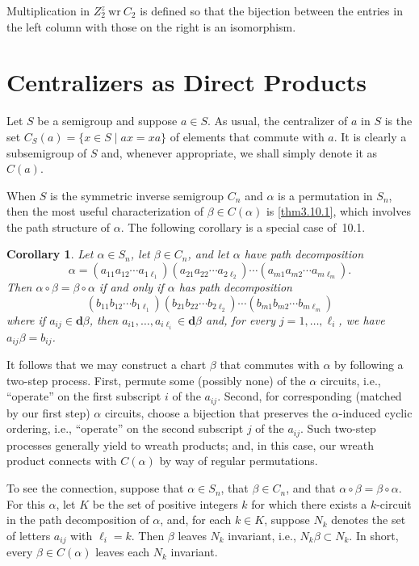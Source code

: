 \documentclass{surv-l}
\numberwithin{equation}{section}
\numberwithin{table}{section}
\numberwithin{figure}{section}
\theoremstyle{plain}
\newtheorem{corollary}[equation]{Corollary}
\theoremstyle{definition}
\begin{document}
Multiplication in $Z_{2}^{z}\  \mathrm{wr} \ C_{2}$ is defined so
that the bijection between the entries in the left column with
those on the right is an isomorphism.

\section[Centralizers as Directs Products]{Centralizers as Direct Products}\label{sec4.13}

Let $S$ be a semigroup and suppose $a\in S$. As usual, the
centralizer of $a$ in $S$ is the set $C_{S}(a)=\{x\in S \mid
ax =xa\}$ of elements that commute with $a$. It is clearly a
subsemigroup of $S$ and, whenever appropriate, we shall simply
denote it as~$C(a)$.

When $S$ is the symmetric inverse semigroup $C_{n}$ and $\alpha$
is a permutation in $S_{n}$, then the most useful characterization
of $\beta\in C(\alpha)$ is \ref{thm3.10.1}, which involves the
path structure of $\alpha$. The following corollary is a special
case of~10.1.

\begin{corollary}\label{cor3.13.1}
Let $\alpha\in S_{n}$, let $\beta\in C_{n}$, and let $\alpha$ have
path decomposition
\[
\alpha=(a_{11}a_{12}\cdots a_{1\ell_{1}})(a_{21}a_{22}\cdots a_{2\ell_{2}})\cdots(a_{m1}a_{m2}\cdots a_{m\ell_{m}}).
\]
Then $\alpha \circ\beta=\beta \circ\alpha$ if and only if $\alpha$
has path decomposition
\[
(b_{11}b_{12}\cdots b_{1\ell_{1}})(b_{21}b_{22}\cdots b_{2\ell_{2}})\cdots(b_{m1}b_{m2}\cdots b_{m\ell_{m}})
\]
where if $a_{ij}\in \mathbf{d}\beta$, then $a_{i1},\ldots,
a_{i\ell_{i}}\in \mathbf{d}\beta$ and, for every $j=1,\ldots,
\ell_{i}$, we have $a_{ij}\beta=b_{ij}$.
\end{corollary}

It follows that we may construct a chart $\beta$ that commutes
with $\alpha$ by following a two-step process. First, permute some
(possibly none) of the $\alpha$ circuits, i.e., ``operate'' on the
first subscript $i$ of the $a_{ij}$. Second, for corresponding
(matched by our first step) $\alpha$ circuits, choose a bijection
that preserves the $\alpha$-induced cyclic ordering, i.e.,
``operate'' on the second subscript $j$ of the $a_{ij}$. Such
two-step processes generally yield to wreath products; and, in
this case, our wreath product connects with $C(\alpha)$ by way of
regular permutations.

To see the connection, suppose that $\alpha\in S_{n}$, that
$\beta\in C_{n}$, and that $\alpha \circ\beta=\beta \circ\alpha$.
For this $\alpha$, let $K$ be the set of positive integers $k$ for
which there exists a $k$-circuit in the path decomposition of
$\alpha$, and, for each $k\in K$, suppose $N_{k}$ denotes the set
of letters $a_{ij}$ with $\ell_{i}=k$. Then $\beta$ leaves $N_{k}$
invariant, i.e., $N_{k}\beta\subset N_{k}$. In short, every
$\beta\in C(\alpha)$ leaves each $N_{k}$ invariant.
\end{document}

